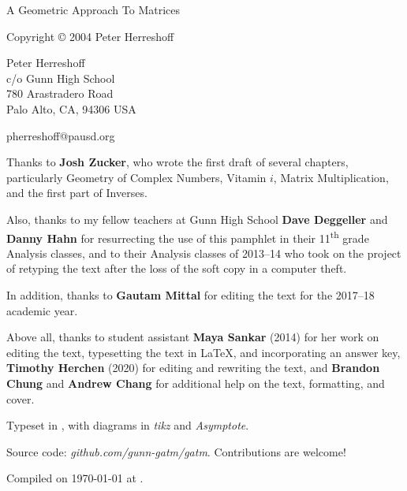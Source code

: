 \documentclass[../textbook.tex]{subfiles}
\begin{document}
\newcommand\dnew{\vspace{1cm}}

\begin{center}
	\vspace*{\fill}

	\doublespacing
	A Geometric Approach To Matrices

    Copyright \copyright{} 2004 Peter Herreshoff  %

	\vspace{1cm}

	Peter Herreshoff\\
	c/o Gunn High School\\
	780 Arastradero Road\\
	Palo Alto, CA, 94306 USA

	\vspace{.5cm}

    pherreshoff@pausd.org %

	\vspace{1cm}
\end{center}

\noindent Thanks to \textbf{Josh Zucker}, who wrote the first draft of several chapters, particularly Geometry of Complex Numbers, Vitamin $i$, Matrix Multiplication, and the first part of Inverses.

\noindent Also, thanks to my fellow teachers at Gunn High School \textbf{Dave Deggeller} and \textbf{Danny Hahn} for resurrecting the use of this pamphlet in their 11\textsuperscript{th} grade Analysis classes, and to their Analysis classes of 2013--14 who took on the project of retyping the text after the loss of the soft copy in a computer theft.

\noindent In addition, thanks to \textbf{Gautam Mittal} for editing the text for the 2017--18 academic year.

\noindent Above all, thanks to student assistant \textbf{Maya Sankar} (2014) for her work on editing the text, typesetting the text in \LaTeX{}, and incorporating an answer key, \textbf{Timothy Herchen} (2020) for editing and rewriting the text, and \textbf{Brandon Chung} and \textbf{Andrew Chang} for additional help on the text, formatting, and cover.

\vspace{0.5cm}

\noindent Typeset in \LaTeXe, with diagrams in \textit{tikz} and \textit{Asymptote}.

\noindent Source code: \textit{github.com/gunn-gatm/gatm}. Contributions are welcome!

\noindent Compiled on {\ddmmyyyydate\today} at \currenttime.

\vspace*{\fill}
\end{document}
